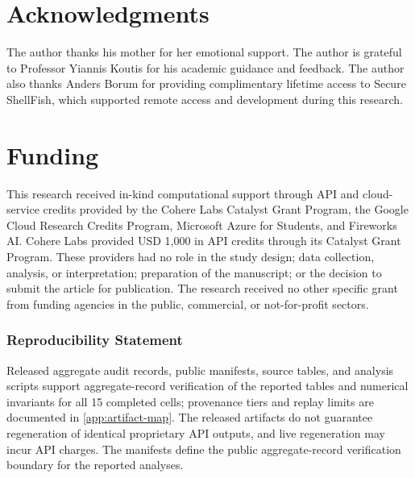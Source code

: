\documentclass[preprint,12pt]{elsarticle}
\begin{document}
\begin{frontmatter}

\end{frontmatter}















\section*{Acknowledgments}
The author thanks his mother for her emotional support. The author is grateful to Professor Yiannis
Koutis for his academic guidance and feedback. The author also thanks Anders Borum for providing
complimentary lifetime access to Secure ShellFish, which supported remote access and development
during this research.

\section*{Funding}
This research received in-kind computational support through API and cloud-service credits provided
by the Cohere Labs Catalyst Grant Program, the Google Cloud Research Credits Program, Microsoft
Azure for Students, and Fireworks AI. Cohere Labs provided USD 1,000 in API credits through its
Catalyst Grant Program. These providers had no role in the study design; data collection, analysis,
or interpretation; preparation of the manuscript; or the decision to submit the article for
publication. The research received no other specific grant from funding agencies in the public,
commercial, or not-for-profit sectors.

\subsubsection*{Reproducibility Statement}
Released aggregate audit records, public manifests, source tables, and analysis scripts support
aggregate-record verification of the reported tables and numerical invariants for all 15 completed
cells; provenance tiers and replay limits are documented in \ref{app:artifact-map}. The released
artifacts do not guarantee regeneration of identical proprietary API outputs, and live regeneration
may incur API charges. The manifests define the public aggregate-record verification boundary for
the reported analyses.
\end{document}
